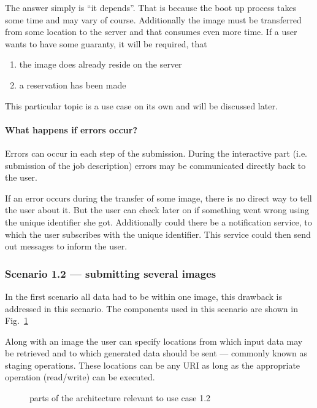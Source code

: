 The answer simply  is ``it depends''. That is because  the boot up process
takes some  time and may vary  of course.  Additionally the  image must be
transferred from some  location to the server and  that consumes even more
time. If a user wants to have some guaranty, it will be required, that
\begin{enumerate}
\item the image does already reside on the server
\item a reservation has been made
\end{enumerate}

This  particular topic is  a use  case on  its own  and will  be discussed
later.

\paragraph*{What happens if errors occur?}

Errors can occur  in each step of the  submission.  During the interactive
part (i.e. submission  of the job description) errors  may be communicated
directly back to the user.

If an error  occurs during the transfer of some image,  there is no direct
way  to tell  the user  about it.   But  the user  can check  later on  if
something went  wrong using the  unique identifier she  got.  Additionally
could there be  a notification service, to which  the user subscribes with
the unique identifier. This service could then send out messages to inform
the user.

\subsubsection{Scenario 1.2 --- submitting several images}

In the first  scenario all data had to be within  one image, this drawback
is addressed in this scenario. The components used in this scenario are
shown in Fig.~\ref{fig:arch-uc-1.2}

Along with an  image the user can specify locations  from which input data
may be retrieved  and to which generated data should  be sent --- commonly
known as staging operations. These locations can be any URI as long as the
appropriate operation (read/write) can be executed.

\begin{figure}[htbp]
  \begin{center}
  \end{center}
  \caption[Architecture UC 1.2]{parts of the architecture relevant to use
    case 1.2}
  \label{fig:arch-uc-1.2}
\end{figure}

